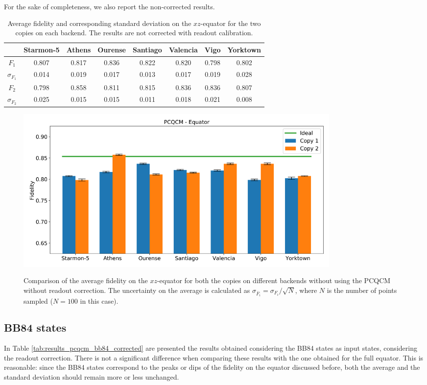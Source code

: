 For the sake of completeness, we also report the non-corrected results.
\begin{table}[H]
  \centering
  \begin{tabular}{|c|c|c|c|c|c|c|c|}
  \hline
  \textbf{} & \textbf{Starmon-5} & \textbf{Athens} & \textbf{Ourense} & \textbf{Santiago} & \textbf{Valencia} & \textbf{Vigo} & \textbf{Yorktown} \\ \hline
  $F_1$              & 0.807 & 0.817 & 0.836 & 0.822 & 0.820 & 0.798 & 0.802 \\ \hline
  $\sigma_{F_1}$     & 0.014 & 0.019 & 0.017 & 0.013 & 0.017 & 0.019 & 0.028 \\ \hline
  $F_2$              & 0.798 & 0.858 & 0.811 & 0.815 & 0.836 & 0.836 & 0.807 \\ \hline
  $\sigma_{F_2}$     & 0.025 & 0.015 & 0.015 & 0.011 & 0.018 & 0.021 & 0.008 \\ \hline
  \end{tabular}
  \caption{Average fidelity and corresponding standard deviation on the $xz$-equator for the two copies on each backend. The results are not corrected with readout calibration.}
  \label{tab:results_pcqcm_onlyequator_not_corrected}
\end{table}
\begin{figure}[H]
  \centering
          \includegraphics[width=0.8\textwidth]{Figures/PhaseCovariant/Histograms/histo_equator.png}
      \label{fig:pc_histo_equator_not_corrected}
      \caption{Comparison of the average fidelity on the $xz$-equator for both the copies on different backends without using the PCQCM without readout correction. The uncertainty on the average is calculated as $\sigma_{\overline{F}_i}=\sigma_{F_i}/\sqrt{N}$, where $N$ is the number of points sampled ($N=100$ in this case).}
\end{figure}

\subsection{BB84 states}
In Table \ref{tab:results_pcqcm_bb84_corrected} are presented the results obtained considering the BB84 states as input states, considering the readout correction.
There is not a significant difference when comparing these results with the one obtained for the full equator.
This is reasonable: since the BB84 states correspond to the peaks or dips of the fidelity on the equator discussed before, 
both the average and the standard deviation should remain more or less unchanged.

